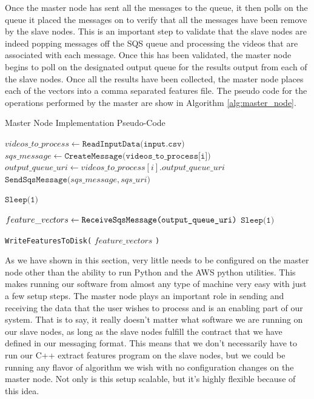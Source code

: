 Once the master node has sent all the messages to the queue, it then polls
on the queue it placed the messages on to verify that all the messages have been
remove by the slave nodes. This is an important step to validate that the
slave nodes are indeed popping messages off the SQS queue and processing
the videos that are associated with each message. Once this has been validated,
the master node begins to poll on the designated output queue for the results output
from each of the slave nodes. Once all the results have been collected, the master
node places each of the vectors into a comma separated features file.
The pseudo code for the operations performed by the master are show in Algorithm
\ref{alg:master_node}.

\begin{algorithm}
\caption{Master Node Implementation Pseudo-Code}
\label{alg:master_node}
\begin{algorithmic}[1]
  \State $videos\_to\_process \gets \texttt{ReadInputData(input.csv)}$
    \State $sqs\_message \gets \texttt{CreateMessage(videos\_to\_process[i])}$
    \State $output\_queue\_uri \gets videos\_to\_process[i].output\_queue\_uri$
    \State$\texttt{SendSqsMessage(}sqs\_message, sqs\_uri \texttt{)}$
  \EndFor

   
    \State $\texttt{Sleep(1)}$
  \EndWhile

    \State $feature\_vectors \gets \texttt{ReceiveSqsMessage(output\_queue\_uri\texttt{)}}$
    \State $\texttt{Sleep(1)}$
  \EndWhile

  \State \texttt{WriteFeaturesToDisk(} $feature\_vectors$ \texttt{)}

\end{algorithmic}
\end{algorithm}

As we have shown in this section, very little needs to be configured on the master
node other than the ability to run Python and the AWS python utilities. This
makes running our software from almost any type of machine very easy with just a
few setup steps. The master node plays an important role in sending and receiving
the data that the user wishes to process and is an enabling part of our system.
That is to say, it really doesn't matter what software we are running on our
slave nodes, as long as the slave nodes fulfill the contract that we have
defined in our messaging format. This means that we don't necessarily have to
run our C++ extract features program on the slave nodes, but we could be running
any flavor of algorithm we wish with no configuration changes on the master node.
Not only is this setup scalable, but it's highly flexible because of this idea.

